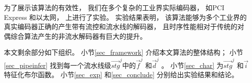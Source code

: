 为了展示该算法的有效性，
我们在多个复杂的工业界实际编码器，
如PCI Express  和以太网，
上进行了实验。
实验结果表明，
该算法能够为多个工业界的真实编码器正确的产生带有流控和流水线的解码器，
且时序性能相对于传统的对偶综合算法产生的非流水解码器有巨大的提升。



本文剩余部分如下组织。
小节\ref{sec_framework} 介绍本文算法的整体结构；
小节\ref{sec_pipeinfer} 找到每一个流水线级$\vec{stg}^j$中的$\vec{f}^j$ 和$\vec{d}^j$ 。
小节\ref{sec_char} 为$\vec{stg}^j$ 和$\vec{i}$特征化布尔函数。
小节\ref{sec_exp} 和\ref{sec_conclude} 分别给出实验结果和结论。


%
%
%
%
%
%
%
%
%
%
%

